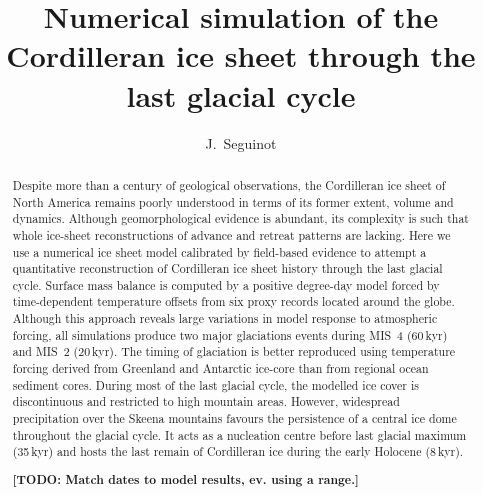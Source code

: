 \documentclass[tc, ms]{copernicus}
\def\todo#1{\textcolor[rgb]{0.5,0,0}{\textbf{[TODO: #1]}}}
\begin{document}
\hack{\sloppy}

\title{Numerical simulation of the Cordilleran ice sheet
       through the last glacial cycle}

\author[1,2]{J.~Seguinot}



\received{}
\accepted{}
\published{}

\maketitle

\begin{abstract}

  Despite more than a century of geological observations, the Cordilleran ice
  sheet of North America remains poorly understood in terms of its former
  extent, volume and dynamics. Although geomorphological evidence is abundant,
  its complexity is such that whole ice-sheet reconstructions of advance and
  retreat patterns are lacking. Here we use a numerical ice sheet model
  calibrated by field-based evidence to attempt a quantitative reconstruction
  of Cordilleran ice sheet history through the last glacial cycle. Surface mass
  balance is computed by a positive degree-day model forced by time-dependent
  temperature offsets from six proxy records located around the globe. Although
  this approach reveals large variations in model response to atmospheric
  forcing, all simulations produce two major glaciations events during MIS~4
  (60\,\unit{kyr}) and MIS~2 (20\,\unit{kyr}). The timing of glaciation is
  better reproduced using temperature forcing derived from Greenland and
  Antarctic ice-core than from regional ocean sediment cores. During most of
  the last glacial cycle, the modelled ice cover is discontinuous and
  restricted to high mountain areas. However, widespread precipitation over the
  Skeena mountains favours the persistence of a central ice dome throughout the
  glacial cycle. It acts as a nucleation centre before last glacial maximum
  (35\,\unit{kyr}) and hosts the last remain of Cordilleran ice during the
  early Holocene (8\,\unit{kyr}).

  \todo{Match dates to model results, ev. using a range.}

\end{abstract}
\end{document}

